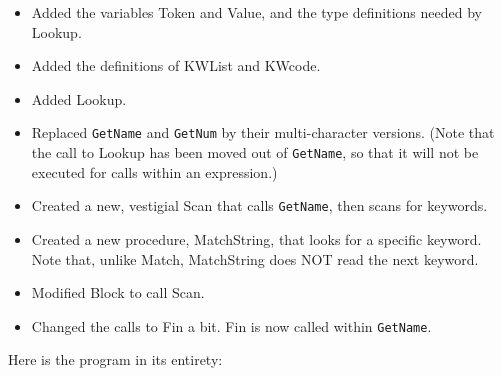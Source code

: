 \begin{itemize}
\item	Added the variables Token  and Value, and the type definitions needed by Lookup.
\item	Added the definitions of KWList and KWcode.
\item	Added Lookup.
\item	Replaced {\tt GetName} and {\tt GetNum} by their multi-character versions. (Note that the call  to  Lookup has been moved out of {\tt GetName}, so  that  it  will  not   be  executed  for  calls  within  an expression.)
\item	Created a new, vestigial  Scan that calls {\tt GetName}, then scans for keywords.
\item	Created  a  new  procedure, MatchString, that  looks  for  a specific keyword. Note that, unlike  Match, MatchString does NOT read the next keyword.
\item	Modified Block to call Scan.
\item	Changed the calls  to  Fin  a  bit. Fin is now called within {\tt GetName}.
\end{itemize}

Here is the program in its entirety:

